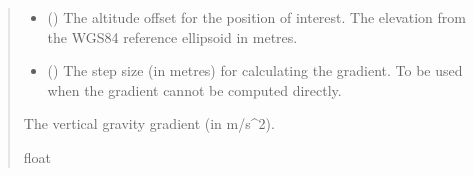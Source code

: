 \documentclass[letterpaper,10pt,english]{sphinxmanual}
\begin{document}
\begin{fulllineitems}
\begin{fulllineitems}
\begin{quote}
\begin{description}
\begin{itemize}
\item {} 
\sphinxAtStartPar
{} () \textendash{} The altitude offset for the position of interest.
The elevation from the WGS\sphinxhyphen{}84 reference ellipsoid in metres.

\item {} 
\sphinxAtStartPar
{} () \textendash{} The step size (in metres) for calculating the gradient.
To be used when the gradient cannot be computed directly.

\end{itemize}

\sphinxAtStartPar
The vertical gravity gradient (in m/s\textasciicircum{}2).

\sphinxAtStartPar
float

\end{description}\end{quote}

\end{fulllineitems}



\end{fulllineitems}
\end{document}
